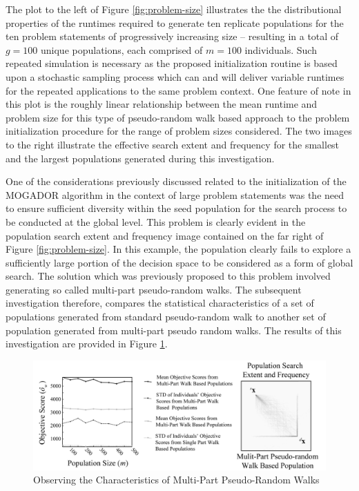 The plot to the left of Figure \ref{fig:problem-size} illustrates the the distributional properties of the runtimes required to generate ten replicate populations for the ten problem statements of progressively increasing size -- resulting in a total of $g = 100$ unique populations, each comprised of $m = 100$ individuals. Such repeated simulation is necessary as the proposed initialization routine is based upon a stochastic sampling process which can and will deliver variable runtimes for the repeated applications to the same problem context. One feature of note in this plot is the roughly linear relationship between the mean runtime and problem size for this type of pseudo-random walk based approach to the problem initialization procedure for the range of problem sizes considered. The two images to the right illustrate the effective search extent and frequency for the smallest and the largest populations generated during this investigation.
            
One of the considerations previously discussed related to the initialization of the MOGADOR algorithm in the context of large problem statements was the need to ensure sufficient diversity within the seed population for the search process to be conducted at the global level. This problem is clearly evident in the population search extent and frequency image contained on the far right of Figure \ref{fig:problem-size}.  In this example, the population clearly fails to explore a sufficiently large portion of the decision space to be considered as a form of global search. The solution which was previously proposed to this problem involved generating so called multi-part pseudo-random walks. The subsequent investigation therefore, compares the statistical characteristics of a set of populations generated from standard pseudo-random walk to another set of population generated from multi-part pseudo random walks. The results of this investigation are provided in Figure \ref{fig:multi-part-walk-study}.
            
            \begin{figure}[!h]
            \centering
            \includegraphics[width=5.5in]{figures/multi-part-walk-study.png}
            \caption[Observing the Characteristics of Multi-Part Pseudo-Random Walks]{Observing the Characteristics of Multi-Part Pseudo-Random Walks}
            \label{fig:multi-part-walk-study}
            \end{figure}
            
